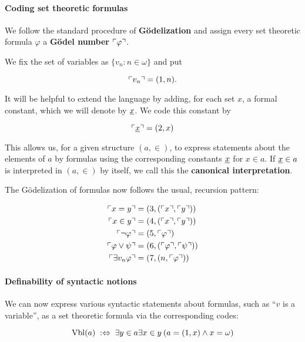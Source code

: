 \paragraph{Coding set theoretic formulas}

We follow the standard procedure of \textbf{Gödelization} and assign every set theoretic formula $\varphi$ a \textbf{Gödel number} $\ulcorner \varphi \urcorner$.

We fix the set of variables as $\{v_n: n \in \omega\}$ and put

\begin{equation}
\ulcorner v_n \urcorner = (1,n).
\end{equation}

It will be helpful to extend the language by adding, for each set $x$, a formal constant, which we will denote by $\underline{x}$. We code this constant by

\begin{equation}
\ulcorner \underline{x} \urcorner = (2,x)
\end{equation}

This allows us, for a given structure $(a,\in)$, to express statements about the elements of $a$ by formulas using the corresponding constants $\underline{x}$ for $x \in a$. If $\underline{x} \in a$ is interpreted in $(a,\in)$ by itself, we call this the \textbf{canonical interpretation}.

The Gödelization of formulas now follows the usual, recursion pattern:

\begin{align*}
\ulcorner x=y \urcorner & = (3, (\ulcorner x \urcorner, \ulcorner y \urcorner)) \\
\ulcorner x\in y \urcorner & = (4, (\ulcorner x \urcorner, \ulcorner y \urcorner)) \\
\ulcorner \neg \varphi \urcorner & = (5, \ulcorner \varphi \urcorner) \\
\ulcorner \varphi \vee \psi \urcorner & = (6, (\ulcorner \varphi \urcorner, \ulcorner \psi \urcorner)) \\
\ulcorner \exists v_n \varphi \urcorner & = (7, (n, \ulcorner \varphi \urcorner)) \\
\end{align*}

\paragraph{Definability of syntactic notions}

We can now express various syntactic statements about formulas, such as ``$v$ is a variable'', as a set theoretic formula via the corresponding codes:

\begin{equation}
\operatorname{Vbl}(a) \; :\Leftrightarrow \; \exists y \in a \exists x \in y \: (a = (1,x) \wedge x = \omega)
\end{equation}

